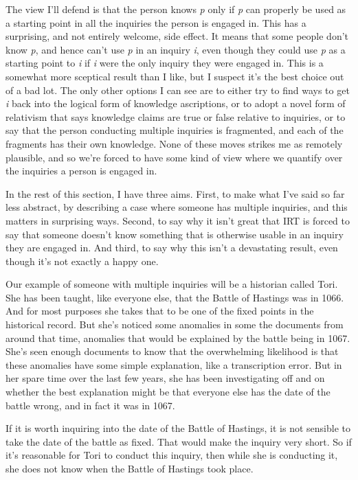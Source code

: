 \documentclass[
  12pt,
  letterpaper,
]{scrbook}
\begin{document}
The view I'll defend is that the person knows \emph{p} only if \emph{p}
can properly be used as a starting point in all the inquiries the person
is engaged in. This has a surprising, and not entirely welcome, side
effect. It means that some people don't know \emph{p}, and hence can't
use \emph{p} in an inquiry \emph{i}, even though they could use \emph{p}
as a starting point to \emph{i} if \emph{i} were the only inquiry they
were engaged in. This is a somewhat more sceptical result than I like,
but I suspect it's the best choice out of a bad lot. The only other
options I can see are to either try to find ways to get \emph{i} back
into the logical form of knowledge ascriptions, or to adopt a novel form
of relativism that says knowledge claims are true or false relative to
inquiries, or to say that the person conducting multiple inquiries is
fragmented, and each of the fragments has their own knowledge. None of
these moves strikes me as remotely plausible, and so we're forced to
have some kind of view where we quantify over the inquiries a person is
engaged in.

In the rest of this section, I have three aims. First, to make what I've
said so far less abstract, by describing a case where someone has
multiple inquiries, and this matters in surprising ways. Second, to say
why it isn't great that IRT is forced to say that someone doesn't know
something that is otherwise usable in an inquiry they are engaged in.
And third, to say why this isn't a devastating result, even though it's
not exactly a happy one.

Our example of someone with multiple inquiries will be a historian
called Tori. She has been taught, like everyone else, that the Battle of
Hastings was in 1066. And for most purposes she takes that to be one of
the fixed points in the historical record. But she's noticed some
anomalies in some the documents from around that time, anomalies that
would be explained by the battle being in 1067. She's seen enough
documents to know that the overwhelming likelihood is that these
anomalies have some simple explanation, like a transcription error. But
in her spare time over the last few years, she has been investigating
off and on whether the best explanation might be that everyone else has
the date of the battle wrong, and in fact it was in 1067.

If it is worth inquiring into the date of the Battle of Hastings, it is
not sensible to take the date of the battle as fixed. That would make
the inquiry very short. So if it's reasonable for Tori to conduct this
inquiry, then while she is conducting it, she does not know when the
Battle of Hastings took place.
\end{document}
